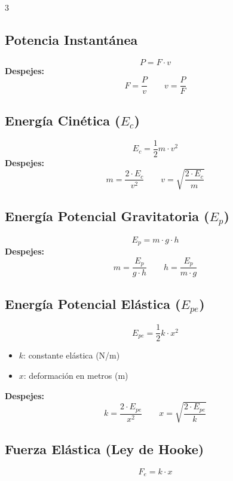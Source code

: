 \documentclass[10pt,landscape]{article}
\begin{document}
\begin{multicols}{3}
\subsection*{Potencia Instant\'{a}nea}
\[
\boxed{P = F \cdot v}
\]
\textbf{Despejes:}
\[
F = \frac{P}{v} \qquad v = \frac{P}{F}
\]

\vspace{4pt}

\subsection*{Energ\'{i}a Cin\'{e}tica ($E_c$)}
\[
\boxed{E_c = \frac{1}{2} m \cdot v^2}
\]
\textbf{Despejes:}
\[
m = \frac{2 \cdot E_c}{v^2} \qquad v = \sqrt{\frac{2 \cdot E_c}{m}}
\]

\subsection*{Energ\'{i}a Potencial Gravitatoria ($E_p$)}
\[
\boxed{E_p = m \cdot g \cdot h}
\]
\textbf{Despejes:}
\[
m = \frac{E_p}{g \cdot h} \qquad h = \frac{E_p}{m \cdot g}
\]

\subsection*{Energ\'{i}a Potencial El\'{a}stica ($E_{pe}$)}
\[
\boxed{E_{pe} = \frac{1}{2} k \cdot x^2}
\]
\begin{itemize}[leftmargin=*,nosep,topsep=0pt]
  \item $k$: constante el\'{a}stica (N/m)
  \item $x$: deformaci\'{o}n en metros (m)
\end{itemize}
\textbf{Despejes:}
\[
k = \frac{2 \cdot E_{pe}}{x^2} \qquad x = \sqrt{\frac{2 \cdot E_{pe}}{k}}
\]

\subsection*{Fuerza El\'{a}stica (Ley de Hooke)}
\[
\boxed{F_e = k \cdot x}
\]



\end{multicols}
\end{document}
